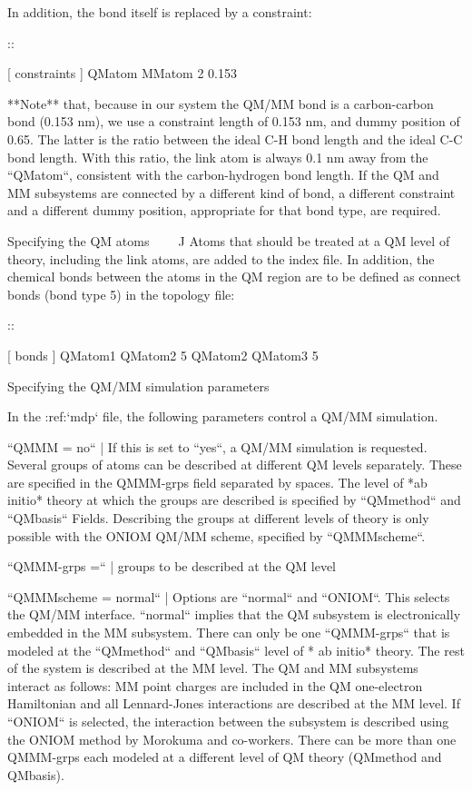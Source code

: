 In addition, the bond itself is replaced by a constraint:

::

    [ constraints ]
    QMatom MMatom 2 0.153

**Note** that, because in our system the QM/MM bond is a carbon-carbon
bond (0.153 nm), we use a constraint length of 0.153 nm, and dummy
position of 0.65. The latter is the ratio between the ideal C-H bond
length and the ideal C-C bond length. With this ratio, the link atom is
always 0.1 nm away from the ``QMatom``, consistent with the
carbon-hydrogen bond length. If the QM and MM subsystems are connected
by a different kind of bond, a different constraint and a different
dummy position, appropriate for that bond type, are required.

Specifying the QM atoms
^^^^^^^^^^^^^^^^^^^^^^^

Atoms that should be treated at a QM level of theory, including the link
atoms, are added to the index file. In addition, the chemical bonds
between the atoms in the QM region are to be defined as connect bonds
(bond type 5) in the topology file:

::

    [ bonds ]
    QMatom1 QMatom2 5
    QMatom2 QMatom3 5

Specifying the QM/MM simulation parameters
^^^^^^^^^^^^^^^^^^^^^^^^^^^^^^^^^^^^^^^^^^

In the :ref:`mdp` file, the following parameters control a
QM/MM simulation.

``QMMM = no``
    | If this is set to ``yes``, a QM/MM simulation is
      requested. Several groups of atoms can be described at different
      QM levels separately. These are specified in the QMMM-grps field
      separated by spaces. The level of *ab initio* theory at which the
      groups are described is specified by ``QMmethod`` and
      ``QMbasis`` Fields. Describing the groups at different
      levels of theory is only possible with the ONIOM QM/MM scheme,
      specified by ``QMMMscheme``.

``QMMM-grps =``
    | groups to be described at the QM level

``QMMMscheme = normal``
    | Options are ``normal`` and ``ONIOM``. This
      selects the QM/MM interface. ``normal`` implies that
      the QM subsystem is electronically embedded in the MM subsystem.
      There can only be one ``QMMM-grps`` that is modeled at
      the ``QMmethod`` and ``QMbasis`` level of
      * ab initio* theory. The rest of the system is described at the MM
      level. The QM and MM subsystems interact as follows: MM point
      charges are included in the QM one-electron Hamiltonian and all
      Lennard-Jones interactions are described at the MM level. If
      ``ONIOM`` is selected, the interaction between the
      subsystem is described using the ONIOM method by Morokuma and
      co-workers. There can be more than one QMMM-grps each modeled at a
      different level of QM theory (QMmethod and QMbasis).

